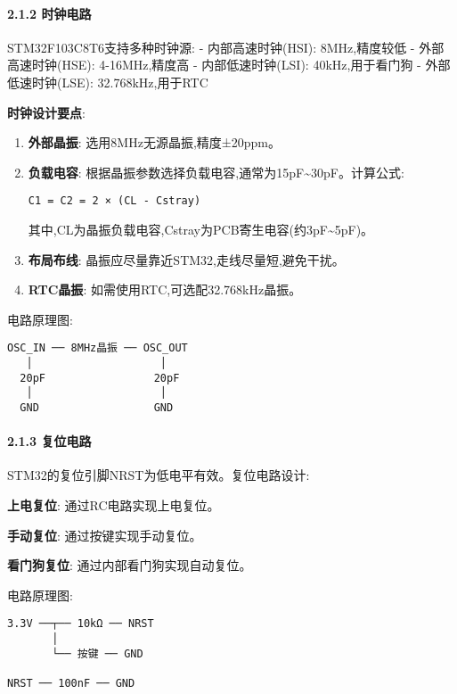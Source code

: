 \documentclass[
]{article}
\begin{document}
\hypertarget{ux65f6ux949fux7535ux8def}{%
\paragraph{2.1.2 时钟电路}\label{ux65f6ux949fux7535ux8def}}

STM32F103C8T6支持多种时钟源: - 内部高速时钟(HSI): 8MHz,精度较低 -
外部高速时钟(HSE): 4-16MHz,精度高 - 内部低速时钟(LSI): 40kHz,用于看门狗
- 外部低速时钟(LSE): 32.768kHz,用于RTC

\textbf{时钟设计要点}:

\begin{enumerate}
\def\labelenumi{\arabic{enumi}.}
\item
  \textbf{外部晶振}: 选用8MHz无源晶振,精度±20ppm。
\item
  \textbf{负载电容}:
  根据晶振参数选择负载电容,通常为15pF\textasciitilde30pF。计算公式:

\begin{verbatim}
C1 = C2 = 2 × (CL - Cstray)
\end{verbatim}

  其中,CL为晶振负载电容,Cstray为PCB寄生电容(约3pF\textasciitilde5pF)。
\item
  \textbf{布局布线}: 晶振应尽量靠近STM32,走线尽量短,避免干扰。
\item
  \textbf{RTC晶振}: 如需使用RTC,可选配32.768kHz晶振。
\end{enumerate}

电路原理图:

\begin{verbatim}
OSC_IN ── 8MHz晶振 ── OSC_OUT
   │                    │
  20pF                 20pF
   │                    │
  GND                  GND
\end{verbatim}

\hypertarget{ux590dux4f4dux7535ux8def}{%
\paragraph{2.1.3 复位电路}\label{ux590dux4f4dux7535ux8def}}

STM32的复位引脚NRST为低电平有效。复位电路设计:

\textbf{上电复位}: 通过RC电路实现上电复位。

\textbf{手动复位}: 通过按键实现手动复位。

\textbf{看门狗复位}: 通过内部看门狗实现自动复位。

电路原理图:

\begin{verbatim}
3.3V ──┬── 10kΩ ── NRST
       │
       └── 按键 ── GND
       
NRST ── 100nF ── GND
\end{verbatim}
\end{document}

